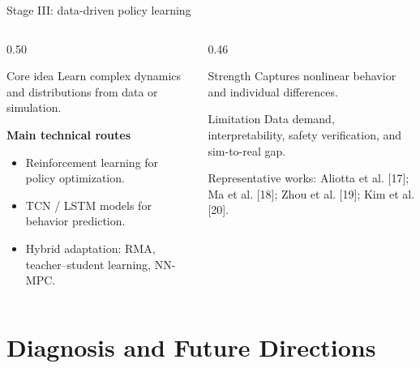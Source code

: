 \documentclass[aspectratio=169]{beamer}
\newcommand{\smallcite}[1]{\textcolor{phriGray}{\scriptsize #1}}
\newcommand{\tightlist}{\setlength{\itemsep}{0.32em}\setlength{\parskip}{0pt}}
\newcommand{\miniheader}[1]{\vspace{0.2em}\textbf{\textcolor{phriBlue}{#1}}}
\begin{document}
\begin{frame}{Stage III: data-driven policy learning}
\begin{columns}[T,onlytextwidth]
    \begin{column}{0.50\textwidth}
        \begin{block}{Core idea}
        Learn complex dynamics and distributions from data or simulation.
        \end{block}
        \miniheader{Main technical routes}
        \begin{itemize}\tightlist
            \item Reinforcement learning for policy optimization.
            \item TCN / LSTM models for behavior prediction.
            \item Hybrid adaptation: RMA, teacher--student learning, NN-MPC.
        \end{itemize}
    \end{column}
    \begin{column}{0.46\textwidth}
        \begin{block}{Strength}
        Captures nonlinear behavior and individual differences.
        \end{block}
        \begin{block}{Limitation}
        Data demand, interpretability, safety verification, and sim-to-real gap.
        \end{block}
        \smallcite{Representative works: Aliotta et al. [17]; Ma et al. [18]; Zhou et al. [19]; Kim et al. [20].}
    \end{column}
\end{columns}
\end{frame}

\section{Diagnosis and Future Directions}
\end{document}
